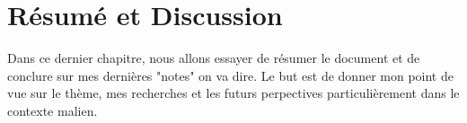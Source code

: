 \chapter{Résumé et Discussion}
\label{chapter6}
Dans ce dernier chapitre, nous allons essayer de résumer le document et de conclure sur mes dernières "notes" on va dire. Le but est de donner mon point de vue sur le thème, mes recherches et les futurs perpectives particulièrement dans le contexte malien.




\clearpage